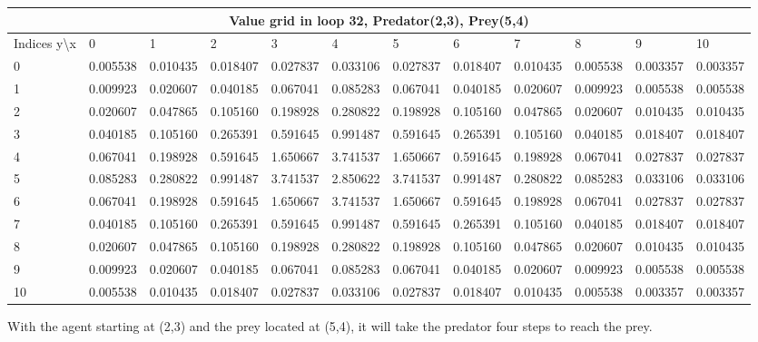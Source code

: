 \documentclass{article}
\begin{document}
\begin{center}
\scalebox{0.7}
	{
	\begin{tabular}{ |l | l | l | l | l | l | l | l | l | l | l | l|}
	\hline
	\multicolumn{12}{|c|}{Value grid in loop 32, Predator(2,3), Prey(5,4)}\\
	\hline
	Indices y\textbackslash x &0 & 1 & 2 & 3 & 4 & 5 & 6 & 7 & 8 & 9 & 10 \\ 

\hline
0 & 0.005538 & 0.010435 & 0.018407 & 0.027837 & 0.033106 & 0.027837 & 0.018407 & 0.010435 & 0.005538 & 0.003357 & 0.003357 \\
1 & 0.009923 & 0.020607 & 0.040185 & 0.067041 & 0.085283 & 0.067041 & 0.040185 & 0.020607 & 0.009923 & 0.005538 & 0.005538 \\
2 & 0.020607 & 0.047865 & 0.105160 & \cellcolor{green!40}0.198928 & 0.280822 & 0.198928 & 0.105160 & 0.047865 & 0.020607 & 0.010435 & 0.010435 \\
3 & 0.040185 & 0.105160 & 0.265391 & 0.591645 & 0.991487 & 0.591645 & 0.265391 & 0.105160 & 0.040185 & 0.018407 & 0.018407 \\
4 & 0.067041 & 0.198928 & 0.591645 & 1.650667 & 3.741537 & 1.650667 & 0.591645 & 0.198928 & 0.067041 & 0.027837 & 0.027837 \\
5 & 0.085283 & 0.280822 & 0.991487 & 3.741537 & \cellcolor{red!40}2.850622 & 3.741537 & 0.991487 & 0.280822 & 0.085283 & 0.033106 & 0.033106 \\
6 & 0.067041 & 0.198928 & 0.591645 & 1.650667 & 3.741537 & 1.650667 & 0.591645 & 0.198928 & 0.067041 & 0.027837 & 0.027837 \\
7 & 0.040185 & 0.105160 & 0.265391 & 0.591645 & 0.991487 & 0.591645 & 0.265391 & 0.105160 & 0.040185 & 0.018407 & 0.018407 \\
8 & 0.020607 & 0.047865 & 0.105160 & 0.198928 & 0.280822 & 0.198928 & 0.105160 & 0.047865 & 0.020607 & 0.010435 & 0.010435 \\
9 & 0.009923 & 0.020607 & 0.040185 & 0.067041 & 0.085283 & 0.067041 & 0.040185 & 0.020607 & 0.009923 & 0.005538 & 0.005538 \\
10 & 0.005538 & 0.010435 & 0.018407 & 0.027837 & 0.033106 & 0.027837 & 0.018407 & 0.010435 & 0.005538 & 0.003357 & 0.003357 \\
\hline
	\end{tabular}
	}
\end{center}

With the agent starting at (2,3) and the prey located at (5,4), it will take the predator four steps to reach the prey.
\end{document}
